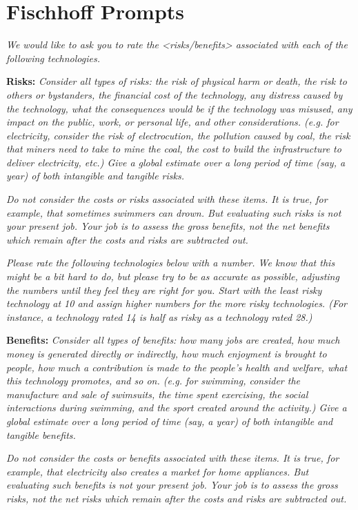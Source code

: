\appendix

\section{Fischhoff Prompts}
\label{sec:prompt} 

\textit{We would like to ask you to rate the <risks/benefits> associated with each of the following technologies.}

{\bf Risks:} \textit{Consider all types of risks: the risk of physical harm or death, the risk to others or bystanders, the financial cost of the technology, any distress caused by the technology, what the consequences would be if the technology was misused, any impact on the public, work, or personal life, and other considerations. (e.g. for electricity, consider the risk of electrocution, the pollution caused by coal, the risk that miners need to take to mine the coal, the cost to build the infrastructure to deliver electricity, etc.) Give a global estimate over a long period of time (say, a year) of both intangible and tangible risks.} 

\textit{Do not consider the costs or risks associated with these items. It is true, for example, that sometimes swimmers can drown. But evaluating such risks is not your present job. Your job is to assess the gross benefits, not the net benefits which remain after the costs and risks are subtracted out.}

\textit{Please rate the following technologies below with a number. We know that this might be a bit hard to do, but please try to be as accurate as possible, adjusting the numbers until they feel they are right for you. Start with the least risky technology at 10 and assign higher numbers for the more risky technologies. (For instance, a technology rated 14 is half as risky as a technology rated 28.)}

{\bf Benefits:} \textit{Consider all types of benefits: how many jobs are created, how much money is generated directly or indirectly, how much enjoyment is brought to people, how much a contribution is made to the people's health and welfare, what this technology promotes, and so on. (e.g. for swimming, consider the manufacture and sale of swimsuits, the time spent exercising, the social interactions during swimming, and the sport created around the activity.) Give a global estimate over a long period of time (say, a year) of both intangible and tangible benefits.}

\textit{Do not consider the costs or benefits associated with these items. It is true, for example, that electricity also creates a market for home appliances. But evaluating such benefits is not your present job. Your job is to assess the gross risks, not the net risks which remain after the costs and risks are subtracted out.} 

